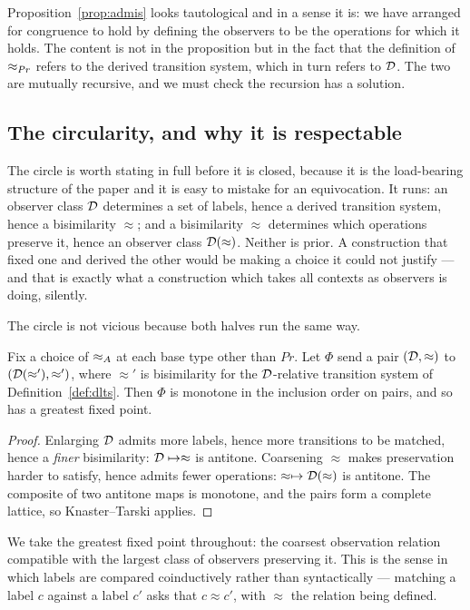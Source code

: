 \documentclass{article}
\begin{document}
Proposition~\ref{prop:admis} looks tautological and in a sense it is: we have arranged for congruence to hold by defining the observers to be the operations for which it holds. The content is not in the proposition but in the fact that the definition of $\approx_{Pr}$ refers to the derived transition system, which in turn refers to $\mathcal{D}$. The two are mutually recursive, and we must check the recursion has a solution.

\subsection{The circularity, and why it is respectable}
\label{sec:fixpoint}

The circle is worth stating in full before it is closed, because it is the load-bearing structure of the paper and it is easy to mistake for an equivocation. It runs: an observer class $\mathcal{D}$ determines a set of labels, hence a derived transition system, hence a bisimilarity $\approx$; and a bisimilarity $\approx$ determines which operations preserve it, hence an observer class $\mathcal{D}(\approx)$. Neither is prior. A construction that fixed one and derived the other would be making a choice it could not justify --- and that is exactly what a construction which takes all contexts as observers is doing, silently.

The circle is not vicious because both halves run the same way.

\begin{proposition}
\label{prop:fixpoint}
    Fix a choice of $\approx_{A}$ at each base type other than $Pr$. Let $\Phi$ send a pair $(\mathcal{D},\approx)$ to $(\mathcal{D}(\approx'),\approx')$, where $\approx'$ is bisimilarity for the $\mathcal{D}$-relative transition system of Definition~\ref{def:dlts}. Then $\Phi$ is monotone in the inclusion order on pairs, and so has a greatest fixed point.
\end{proposition}
\begin{proof}
    Enlarging $\mathcal{D}$ admits more labels, hence more transitions to be matched, hence a \emph{finer} bisimilarity: $\mathcal{D}\mapsto\approx$ is antitone. Coarsening $\approx$ makes preservation harder to satisfy, hence admits fewer operations: $\approx\mapsto\mathcal{D}(\approx)$ is antitone. The composite of two antitone maps is monotone, and the pairs form a complete lattice, so Knaster--Tarski applies.
\end{proof}

We take the greatest fixed point throughout: the coarsest observation relation compatible with the largest class of observers preserving it. This is the sense in which labels are compared coinductively rather than syntactically --- matching a label $c$ against a label $c'$ asks that $c\approx c'$, with $\approx$ the relation being defined.
\end{document}
